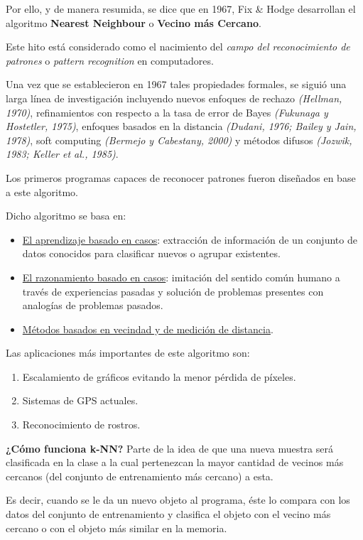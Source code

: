 \documentclass[a4paper, 11pt]{article} %
\begin{document}
Por ello, y de manera resumida, se dice que en 1967, Fix \& Hodge desarrollan el algoritmo \textbf{Nearest Neighbour} o \textbf{Vecino más Cercano}.

Este hito está considerado como el nacimiento del \textit{campo del reconocimiento de patrones} o \textit{pattern recognition} en computadores.

Una vez que se establecieron en 1967 tales propiedades formales, se siguió una larga línea de investigación incluyendo nuevos enfoques de rechazo \textit{(Hellman, 1970)}, refinamientos con respecto a la tasa de error de Bayes \textit{(Fukunaga y Hostetler, 1975)}, enfoques basados en la distancia \textit{(Dudani, 1976; Bailey y Jain, 1978)}, soft computing \textit{(Bermejo y Cabestany, 2000)} y métodos difusos \textit{(Jozwik, 1983; Keller et al., 1985)}.

Los primeros programas capaces de reconocer patrones fueron diseñados en base a este algoritmo.

Dicho algoritmo se basa en:
\begin{itemize}
    \item \underline{El aprendizaje basado en casos}: extracción de información de un conjunto de datos conocidos para clasificar nuevos o agrupar existentes.
    \item \underline{El razonamiento basado en casos}: imitación del sentido común humano a través de experiencias pasadas y solución de problemas presentes con analogías de problemas pasados.
    \item \underline{Métodos basados en vecindad y de medición de distancia}.
\end{itemize}

Las aplicaciones más importantes de este algoritmo son:
\begin{enumerate}
    \item Escalamiento de gráficos evitando la menor pérdida de píxeles.
    \item Sistemas de GPS actuales.
    \item Reconocimiento de rostros.
\end{enumerate}

\textbf{¿Cómo funciona k-NN?}
Parte de la idea de que una nueva muestra será clasificada en la clase a la cual pertenezcan la mayor cantidad de vecinos más cercanos (del conjunto de entrenamiento más cercano) a esta.

Es decir, cuando se le da un nuevo objeto al programa, éste lo compara con los datos del conjunto de entrenamiento y clasifica el objeto con el vecino más cercano o con el objeto más similar en la memoria.
\end{document}
